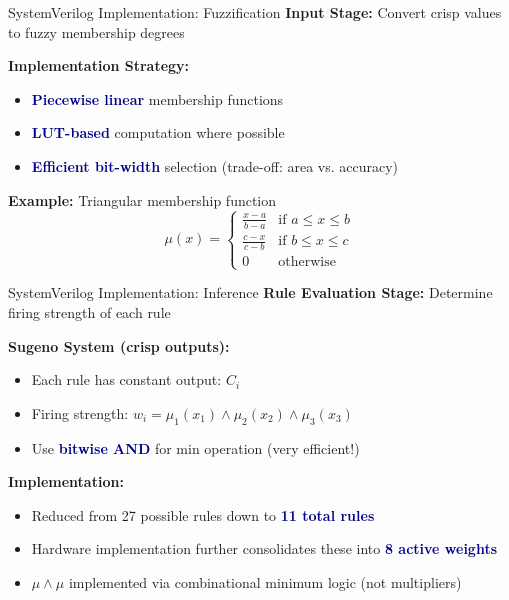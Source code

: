 \documentclass[aspectratio=169,usenames,dvipsnames]{beamer}
\newcommand{\highlight}[1]{\textcolor{darkblue}{\textbf{#1}}}
\begin{document}
\begin{frame}{SystemVerilog Implementation: Fuzzification}
    \textbf{Input Stage:} Convert crisp values to fuzzy membership degrees
    
    \vspace{0.3cm}
    \textbf{Implementation Strategy:}
    \begin{itemize}
        \item \highlight{Piecewise linear} membership functions
        \item \highlight{LUT-based} computation where possible
        \item \highlight{Efficient bit-width} selection (trade-off: area vs. accuracy)
    \end{itemize}
    
    \vspace{0.3cm}
    \textbf{Example:} Triangular membership function
    \[\mu(x) = \begin{cases}
    \frac{x - a}{b - a} & \text{if } a \leq x \leq b \\
    \frac{c - x}{c - b} & \text{if } b \leq x \leq c \\
    0 & \text{otherwise}
    \end{cases}\]
\end{frame}

\begin{frame}{SystemVerilog Implementation: Inference}
    \textbf{Rule Evaluation Stage:} Determine firing strength of each rule
    
    \vspace{0.3cm}
    \textbf{Sugeno System (crisp outputs):}
    \begin{itemize}
        \item Each rule has constant output: $C_i$
        \item Firing strength: $w_i = \mu_1(x_1) \land \mu_2(x_2) \land \mu_3(x_3)$
        \item Use \highlight{bitwise AND} for min operation (very efficient!)
    \end{itemize}
    
    \vspace{0.3cm}
    \textbf{Implementation:}
    \begin{itemize}
        \item Reduced from 27 possible rules down to \highlight{11 total rules}
        \item Hardware implementation further consolidates these into \highlight{8 active weights}
        \item $\mu \land \mu$ implemented via combinational minimum logic (not multipliers)
    \end{itemize}
\end{frame}
\end{document}
